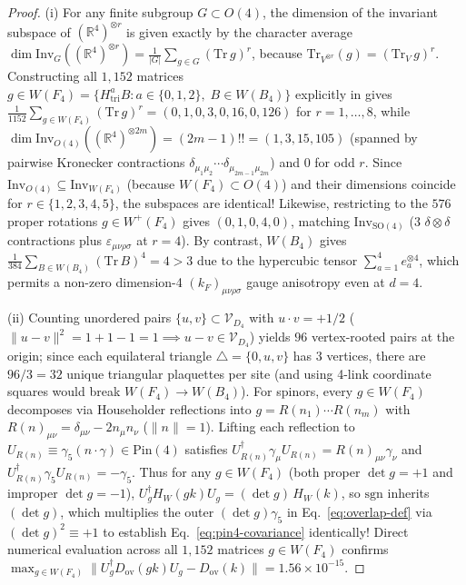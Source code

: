 \documentclass[11pt,a4paper]{article}
\begin{document}
\begin{proof}
(i) For any finite subgroup $G \subset O(4)$, the dimension of the invariant subspace of $(\mathbb{R}^4)^{\otimes r}$ is given exactly by the character average $\dim\mathrm{Inv}_G((\mathbb{R}^4)^{\otimes r}) = \frac{1}{|G|}\sum_{g\in G}(\mathrm{Tr}\,g)^r$, because $\mathrm{Tr}_{V^{\otimes r}}(g) = (\mathrm{Tr}_V\,g)^r$. Constructing all $1,152$ matrices $g \in W(F_4) = \{H_{\mathrm{tri}}^a B : a \in \{0,1,2\},\; B \in W(B_4)\}$ explicitly in  gives $\frac{1}{1152}\sum_{g\in W(F_4)}(\mathrm{Tr}\,g)^r = (0, 1, 0, 3, 0, 16, 0, 126)$ for $r = 1,\dots,8$, while $\dim\mathrm{Inv}_{O(4)}((\mathbb{R}^4)^{\otimes 2m}) = (2m-1)!! = (1, 3, 15, 105)$ (spanned by pairwise Kronecker contractions $\delta_{\mu_1\mu_2}\cdots\delta_{\mu_{2m-1}\mu_{2m}}$) and $0$ for odd $r$. Since $\mathrm{Inv}_{O(4)} \subseteq \mathrm{Inv}_{W(F_4)}$ (because $W(F_4) \subset O(4)$) and their dimensions coincide for $r \in \{1,2,3,4,5\}$, the subspaces are identical! Likewise, restricting to the $576$ proper rotations $g \in W^+(F_4)$ gives $(0, 1, 0, 4, 0)$, matching $\mathrm{Inv}_{\mathrm{SO}(4)}$ ($3$ $\delta\otimes\delta$ contractions plus $\varepsilon_{\mu\nu\rho\sigma}$ at $r = 4$). By contrast, $W(B_4)$ gives $\frac{1}{384}\sum_{B\in W(B_4)}(\mathrm{Tr}\,B)^4 = 4 > 3$ due to the hypercubic tensor $\sum_{a=1}^4 e_a^{\otimes 4}$, which permits a non-zero dimension-4 $(k_F)_{\mu\nu\rho\sigma}$ gauge anisotropy even at $d = 4$.

(ii) Counting unordered pairs $\{u,v\} \subset \mathcal{V}_{D_4}$ with $u\cdot v = +1/2$ ($\|u - v\|^2 = 1 + 1 - 1 = 1 \implies u - v \in \mathcal{V}_{D_4}$) yields $96$ vertex-rooted pairs at the origin; since each equilateral triangle $\triangle = \{0, u, v\}$ has $3$ vertices, there are $96/3 = 32$ unique triangular plaquettes per site (and using 4-link coordinate squares would break $W(F_4) \to W(B_4)$). For spinors, every $g \in W(F_4)$ decomposes via Householder reflections into $g = R(n_1)\cdots R(n_m)$ with $R(n)_{\mu\nu} = \delta_{\mu\nu} - 2 n_\mu n_\nu$ ($\|n\| = 1$). Lifting each reflection to $U_{R(n)} \equiv \gamma_5(n\cdot\gamma) \in \mathrm{Pin}(4)$ satisfies $U_{R(n)}^\dagger \gamma_\mu U_{R(n)} = R(n)_{\mu\nu}\gamma_\nu$ and $U_{R(n)}^\dagger \gamma_5 U_{R(n)} = -\gamma_5$. Thus for any $g \in W(F_4)$ (both proper $\det g = +1$ and improper $\det g = -1$), $U_g^\dagger H_W(g k) U_g = (\det g)\,H_W(k)$, so $\mathrm{sgn}$ inherits $(\det g)$, which multiplies the outer $(\det g)\gamma_5$ in Eq.~\eqref{eq:overlap-def} via $(\det g)^2 \equiv +1$ to establish Eq.~\eqref{eq:pin4-covariance} identically! Direct numerical evaluation across all $1,152$ matrices $g \in W(F_4)$ confirms $\max_{g\in W(F_4)}\|U_g^\dagger D_{\mathrm{ov}}(gk)U_g - D_{\mathrm{ov}}(k)\| = 1.56\times 10^{-15}$.


\end{proof}
\end{document}

